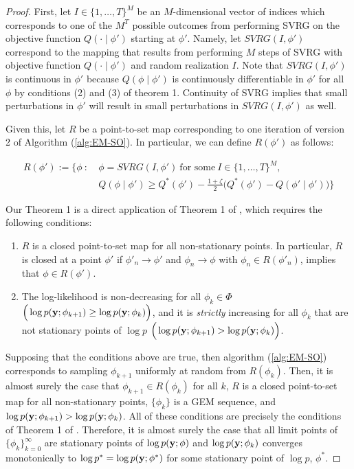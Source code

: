 \begin{proof}

First, let $I \in \{1,\ldots,T\}^M$ be an $M$-dimensional vector of indices which corresponds to one of the $M^T$ possible outcomes from performing SVRG on the objective function $Q(\cdot \mid \phi')$ starting at $\phi'$. Namely, let $SVRG(I,\phi')$ correspond to the mapping that results from performing $M$ steps of SVRG with objective function $Q(\cdot \mid \phi')$ and random realization $I$. Note that $SVRG(I,\phi')$ is continuous in $\phi'$ because $Q(\phi \mid \phi')$ is continuously differentiable in $\phi'$ for all $\phi$ by conditions (2) and (3) of theorem 1. Continuity of SVRG implies that small perturbations in $\phi'$ will result in small perturbations in $SVRG(I,\phi')$ as well.

Given this, let $R$ be a point-to-set map corresponding to one iteration of version 2 of Algorithm (\ref{alg:EM-SO}). In particular, we can define $R(\phi')$ as follows:

\begin{align}
    R(\phi') := \Bigg\{\phi ~ : ~ & \phi = SVRG(I,\phi') ~ \text{for some} ~ I \in \{1,\ldots,T\}^M, \nonumber \\
    & Q(\phi \mid \phi') \geq Q^*(\phi') - \frac{1 + \zeta}{2} \Big( Q^*(\phi') - Q(\phi' \mid \phi') \Big)\Bigg\}
\end{align}

Our Theorem 1 is a direct application of Theorem 1 of \citet{Wu:1983}, which requires the following conditions:

\begin{enumerate}[label=(\alph*)]
    \item $R$ is a closed point-to-set map for all non-stationary points. In particular, $R$ is closed at a point $\phi'$ if $\phi'_{n} \to \phi'$ and $\phi_{n} \to \phi$ with $\phi_{n} \in R(\phi'_{n})$, implies that $\phi \in R(\phi')$. 
    \item The log-likelihood is non-decreasing for all $\phi_k \in \Phi$ $\Big(\log p(\mathbf{y};\phi_{k+1}) \geq \log p(\mathbf{y};\phi_k)\Big)$, and it is \textit{strictly} increasing for all $\phi_k$ that are not stationary points of $\log p$ $\Big(\log p(\mathbf{y};\phi_{k+1}) > \log p(\mathbf{y};\phi_k)\Big)$.
\end{enumerate}

Supposing that the conditions above are true, then algorithm (\ref{alg:EM-SO}) corresponds to sampling $\phi_{k+1}$ uniformly at random from $R(\phi_k)$. Then, it is almost surely the case that $\phi_{k+1} \in R(\phi_k)$ for all $k$, $R$ is a closed point-to-set map for all non-stationary points, $\{\phi_k\}$ is a GEM sequence, and $\log p(\mathbf{y};\phi_{k+1}) > \log p(\mathbf{y};\phi_k)$. All of these conditions are precisely the conditions of Theorem 1 of \citet{Wu:1983}. Therefore, it is almost surely the case that all limit points of $\{\phi_{k}\}_{k=0}^\infty$ are stationary points of $\log p(\mathbf{y};\phi)$ and $\log p(\mathbf{y};\phi_{k})$ converges monotonically to $\log p^* = \log p(\mathbf{y};\phi^*)$ for some stationary point of $\log p$, $\phi^*$. 


\end{proof}

